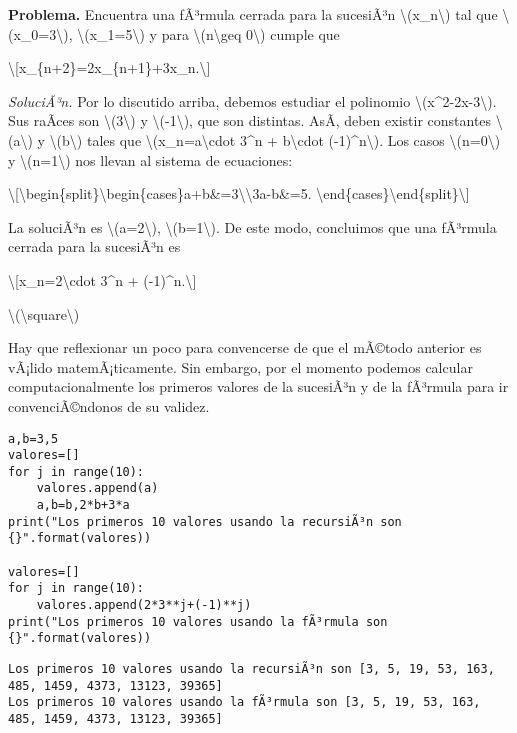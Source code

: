 \textbf{Problema.} Encuentra una fÃ³rmula cerrada para la sucesiÃ³n
{\textbackslash(x\_n\textbackslash)} tal que
{\textbackslash(x\_0=3\textbackslash)},
{\textbackslash(x\_1=5\textbackslash)} y para
{\textbackslash(n\textbackslash geq 0\textbackslash)} cumple que

\textbackslash{[}x\_\{n+2\}=2x\_\{n+1\}+3x\_n.\textbackslash{]}

\emph{SoluciÃ³n.} Por lo discutido arriba, debemos estudiar el polinomio
{\textbackslash(x\^{}2-2x-3\textbackslash)}. Sus raÃ­ces son
{\textbackslash(3\textbackslash)} y {\textbackslash(-1\textbackslash)},
que son distintas. AsÃ­, deben existir constantes
{\textbackslash(a\textbackslash)} y {\textbackslash(b\textbackslash)}
tales que {\textbackslash(x\_n=a\textbackslash cdot 3\^{}n +
b\textbackslash cdot (-1)\^{}n\textbackslash)}. Los casos
{\textbackslash(n=0\textbackslash)} y
{\textbackslash(n=1\textbackslash)} nos llevan al sistema de ecuaciones:

\textbackslash{[}\textbackslash begin\{split\}\textbackslash begin\{cases\}a+b\&=3\textbackslash\textbackslash3a-b\&=5.
\textbackslash end\{cases\}\textbackslash end\{split\}\textbackslash{]}

La soluciÃ³n es {\textbackslash(a=2\textbackslash)},
{\textbackslash(b=1\textbackslash)}. De este modo, concluimos que una
fÃ³rmula cerrada para la sucesiÃ³n es

\textbackslash{[}x\_n=2\textbackslash cdot 3\^{}n +
(-1)\^{}n.\textbackslash{]}

{{\textbackslash(\textbackslash square\textbackslash)}}

Hay que reflexionar un poco para convencerse de que el mÃ©todo anterior
es vÃ¡lido matemÃ¡ticamente. Sin embargo, por el momento podemos
calcular computacionalmente los primeros valores de la sucesiÃ³n y de la
fÃ³rmula para ir convenciÃ©ndonos de su validez.

\begin{verbatim}
a,b=3,5
valores=[]
for j in range(10):
    valores.append(a)
    a,b=b,2*b+3*a
print("Los primeros 10 valores usando la recursiÃ³n son {}".format(valores))

valores=[]
for j in range(10):
    valores.append(2*3**j+(-1)**j)
print("Los primeros 10 valores usando la fÃ³rmula son {}".format(valores))
\end{verbatim}

\begin{verbatim}
Los primeros 10 valores usando la recursiÃ³n son [3, 5, 19, 53, 163, 485, 1459, 4373, 13123, 39365]
Los primeros 10 valores usando la fÃ³rmula son [3, 5, 19, 53, 163, 485, 1459, 4373, 13123, 39365]
\end{verbatim}

